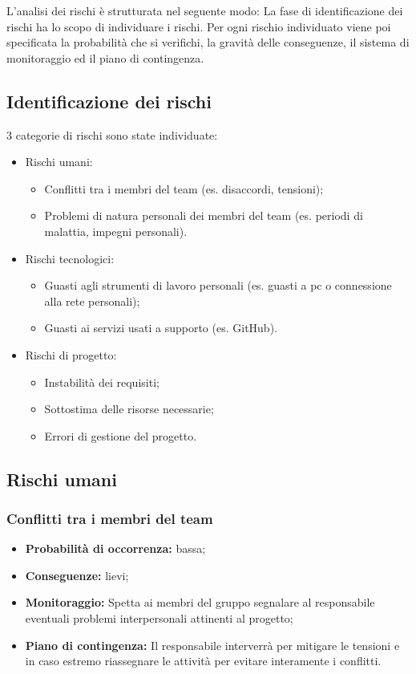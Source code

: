 L'analisi dei rischi è strutturata nel seguente modo:
La fase di identificazione dei rischi ha lo scopo di individuare i rischi.
Per ogni rischio individuato viene poi specificata la probabilità che si verifichi,
la gravità delle conseguenze, il sistema di monitoraggio ed il piano di contingenza.
\subsection{Identificazione dei rischi}
3 categorie di rischi sono state individuate:
\begin{itemize}
\item Rischi umani:
	\begin{itemize}
	\item Conflitti tra i membri del team (es. disaccordi, tensioni);
	\item Problemi di natura personali dei membri del team (es. periodi di malattia, impegni personali).
	\end{itemize}
\item Rischi tecnologici:
	\begin{itemize}
	\item Guasti agli strumenti di lavoro personali (es. guasti a pc o connessione alla rete personali);
	\item Guasti ai servizi usati a supporto (es. GitHub).
	\end{itemize}
\item Rischi di progetto:
	\begin{itemize}
	\item Instabilità dei requisiti;
	\item Sottostima delle risorse necessarie;
	\item Errori di gestione del progetto.
	\end{itemize}
\end{itemize}
\subsection{Rischi umani}
\subsubsection{Conflitti tra i membri del team}
\begin{itemize}
\item \textbf{Probabilità di occorrenza:} bassa;
\item \textbf{Conseguenze:} lievi;
\item \textbf{Monitoraggio:} Spetta ai membri del gruppo segnalare al responsabile eventuali problemi interpersonali attinenti al progetto;
\item \textbf{Piano di contingenza:} Il responsabile interverrà per mitigare le tensioni e in caso estremo riassegnare le attività per evitare interamente i conflitti.
\end{itemize}
